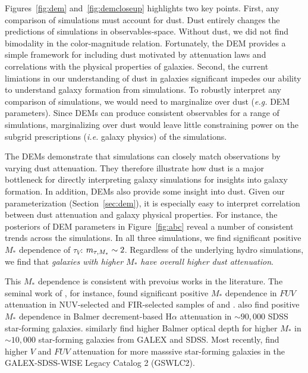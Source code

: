Figures~\ref{fig:dem} and~\ref{fig:demcloseup} highlights two key points. First, any comparison of
simulations must account for dust. Dust entirely changes the predictions of
simulations in observables-space. Without dust, we did not find bimodality in
the color-magnitude relation.
Fortunately, the DEM provides a simple framework
for including dust motivated by attenuation laws and correlations with the
physical properties of galaxies. 
Second, the current limiations in our understanding of dust in galaxies 
significant impedes our ability to understand galaxy formation from simulations. 
To robustly interpret any comparison of simulations, we would need to
marginalize over dust (\emph{e.g.} DEM parameters). Since DEMs can produce
consistent observables for a range of simulations, marginalizing over dust
would leave little constraining power on the subgrid prescriptions (\emph{i.e.}
galaxy physics) of the simulations. 

The DEMs demonstrate that simulations can closely match observations by varying
dust attenuation. They therefore illustrate how dust is a major bottleneck for
directly interpreting galaxy simulations for insights into galaxy formation. In
addition, DEMs also provide some insight into dust. Given our parameterization
(Section~\ref{sec:dem}), it is especially easy to interpret correlation between
dust attenuation and galaxy physical properties. For instance, the posteriors of
DEM parameters in Figure~\ref{fig:abc} reveal a
number of consistent trends across the simulations. In all three simulations, we find significant positive
$M_*$ dependence of $\tau_V$: $m_{\tau,M_*} \sim 2$. Regardless of the underlying
hydro simulations, we find that {\em galaxies with higher $M_*$ have overall higher 
dust attenuation}.

This $M_*$ dependence is consistent with prevoius works in the literature.
The seminal work of \cite{burgarella2005}, for instance, found significant
positive $M_*$ dependence in $FUV$ attenuation in NUV-selected and FIR-selected
samples of \cite{buat2005} and \cite{iglesias-paramo2006}. \cite{garn2010} also
find positive $M_*$ dependence in Balmer decrement-based H$\alpha$ attenuation
in ${\sim}90,000$ SDSS star-forming galaxies. \cite{battisti2016} similarly
find higher Balmer optical depth for higher $M_*$ in ${\sim}10,000$
star-forming galaxies from GALEX and SDSS. Most recently, \cite{salim2018} 
find higher $V$ and $FUV$ attenuation for more masssive star-forming galaxies in the
GALEX-SDSS-WISE Legacy Catalog 2 (GSWLC2). 

